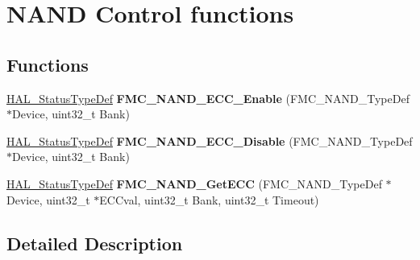 \hypertarget{group___f_m_c___l_l___n_a_n_d___private___functions___group2}{}\section{N\+A\+ND Control functions}
\label{group___f_m_c___l_l___n_a_n_d___private___functions___group2}
\subsection*{Functions}
\begin{DoxyCompactItemize}
\item 
\hyperlink{stm32f4xx__hal__def_8h_a63c0679d1cb8b8c684fbb0632743478f}{H\+A\+L\+\_\+\+Status\+Type\+Def} {\bfseries F\+M\+C\+\_\+\+N\+A\+N\+D\+\_\+\+E\+C\+C\+\_\+\+Enable} (F\+M\+C\+\_\+\+N\+A\+N\+D\+\_\+\+Type\+Def $\ast$Device, uint32\+\_\+t Bank)\hypertarget{group___f_m_c___l_l___n_a_n_d___private___functions___group2_ga9f4f2bd5aac7047be227344b99b371a1}{}\label{group___f_m_c___l_l___n_a_n_d___private___functions___group2_ga9f4f2bd5aac7047be227344b99b371a1}

\item 
\hyperlink{stm32f4xx__hal__def_8h_a63c0679d1cb8b8c684fbb0632743478f}{H\+A\+L\+\_\+\+Status\+Type\+Def} {\bfseries F\+M\+C\+\_\+\+N\+A\+N\+D\+\_\+\+E\+C\+C\+\_\+\+Disable} (F\+M\+C\+\_\+\+N\+A\+N\+D\+\_\+\+Type\+Def $\ast$Device, uint32\+\_\+t Bank)\hypertarget{group___f_m_c___l_l___n_a_n_d___private___functions___group2_ga567e17faf0dd3db7148be9dd1dc1da4b}{}\label{group___f_m_c___l_l___n_a_n_d___private___functions___group2_ga567e17faf0dd3db7148be9dd1dc1da4b}

\item 
\hyperlink{stm32f4xx__hal__def_8h_a63c0679d1cb8b8c684fbb0632743478f}{H\+A\+L\+\_\+\+Status\+Type\+Def} {\bfseries F\+M\+C\+\_\+\+N\+A\+N\+D\+\_\+\+Get\+E\+CC} (F\+M\+C\+\_\+\+N\+A\+N\+D\+\_\+\+Type\+Def $\ast$Device, uint32\+\_\+t $\ast$E\+C\+Cval, uint32\+\_\+t Bank, uint32\+\_\+t Timeout)\hypertarget{group___f_m_c___l_l___n_a_n_d___private___functions___group2_gad992995f2c9337ca28d4fad0de69a8d3}{}\label{group___f_m_c___l_l___n_a_n_d___private___functions___group2_gad992995f2c9337ca28d4fad0de69a8d3}

\end{DoxyCompactItemize}


\subsection{Detailed Description}
